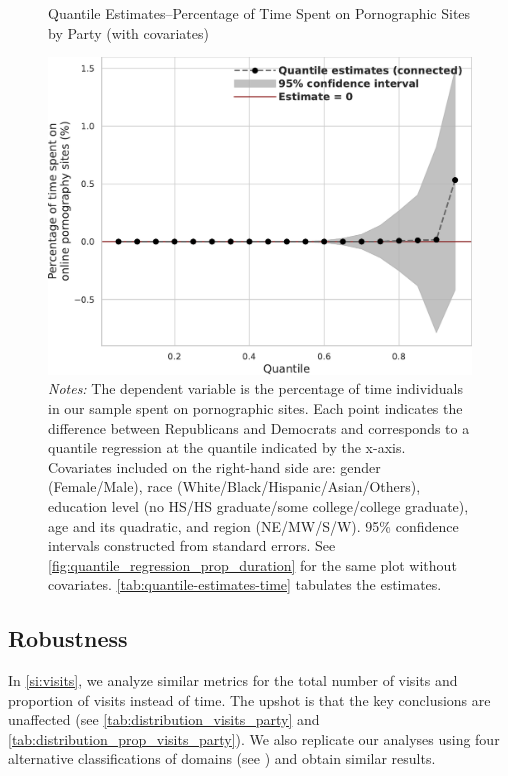 \documentclass[12pt, letterpaper]{article}
\begin{document}
\begin{figure}[ht]
	\centering
	\caption{Quantile Estimates--Percentage of Time Spent on Pornographic Sites by Party (with covariates)}
	\includegraphics[width=.55\linewidth]{figs/quantile_reg_covariates_proportion_duration_adult.pdf}
	\caption*{\footnotesize \emph{Notes:} 
		The dependent variable is the percentage of time individuals in our sample spent on pornographic sites.
		Each point indicates the difference between Republicans and Democrats and corresponds to a quantile regression at the quantile indicated by the x-axis.
		Covariates included on the right-hand side are: gender (Female/Male), race (White/Black/Hispanic/Asian/Others), education level (no HS/HS graduate/some college/college graduate), age and its quadratic, and region (NE/MW/S/W).
		95\% confidence intervals constructed from standard errors.
		See \cref{fig:quantile_regression_prop_duration} for the same plot without covariates.
        \cref{tab:quantile-estimates-time} tabulates the estimates.
	}
	\label{fig:quantile_regression_prop_duration_covariates}
\end{figure}

\subsection{Robustness}
In \ref{si:visits}, we analyze similar metrics for the total number of visits and proportion of visits instead of time. The upshot is that the key conclusions are unaffected (see \cref{tab:distribution_visits_party} and \cref{tab:distribution_prop_visits_party}). We also replicate our analyses using four alternative classifications of domains (see ) and obtain similar results. 
\end{document}
